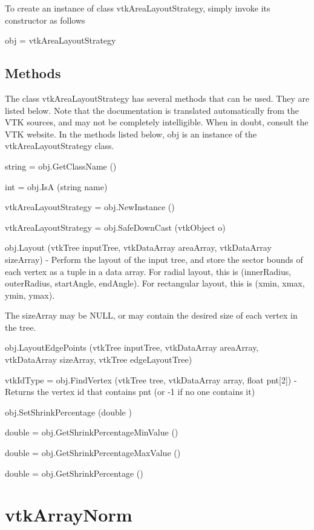 To create an instance of class vtk\-Area\-Layout\-Strategy, simply invoke its constructor as follows \begin{DoxyVerb}  obj = vtkAreaLayoutStrategy
\end{DoxyVerb}
 \hypertarget{vtkwidgets_vtkxyplotwidget_Methods}{}\subsection{Methods}\label{vtkwidgets_vtkxyplotwidget_Methods}
The class vtk\-Area\-Layout\-Strategy has several methods that can be used. They are listed below. Note that the documentation is translated automatically from the V\-T\-K sources, and may not be completely intelligible. When in doubt, consult the V\-T\-K website. In the methods listed below, {\ttfamily obj} is an instance of the vtk\-Area\-Layout\-Strategy class. 
\begin{DoxyItemize}
\item {\ttfamily string = obj.\-Get\-Class\-Name ()}  
\item {\ttfamily int = obj.\-Is\-A (string name)}  
\item {\ttfamily vtk\-Area\-Layout\-Strategy = obj.\-New\-Instance ()}  
\item {\ttfamily vtk\-Area\-Layout\-Strategy = obj.\-Safe\-Down\-Cast (vtk\-Object o)}  
\item {\ttfamily obj.\-Layout (vtk\-Tree input\-Tree, vtk\-Data\-Array area\-Array, vtk\-Data\-Array size\-Array)} -\/ Perform the layout of the input tree, and store the sector bounds of each vertex as a tuple in a data array. For radial layout, this is (inner\-Radius, outer\-Radius, start\-Angle, end\-Angle). For rectangular layout, this is (xmin, xmax, ymin, ymax).

The size\-Array may be N\-U\-L\-L, or may contain the desired size of each vertex in the tree.  
\item {\ttfamily obj.\-Layout\-Edge\-Points (vtk\-Tree input\-Tree, vtk\-Data\-Array area\-Array, vtk\-Data\-Array size\-Array, vtk\-Tree edge\-Layout\-Tree)}  
\item {\ttfamily vtk\-Id\-Type = obj.\-Find\-Vertex (vtk\-Tree tree, vtk\-Data\-Array array, float pnt\mbox{[}2\mbox{]})} -\/ Returns the vertex id that contains pnt (or -\/1 if no one contains it)  
\item {\ttfamily obj.\-Set\-Shrink\-Percentage (double )}  
\item {\ttfamily double = obj.\-Get\-Shrink\-Percentage\-Min\-Value ()}  
\item {\ttfamily double = obj.\-Get\-Shrink\-Percentage\-Max\-Value ()}  
\item {\ttfamily double = obj.\-Get\-Shrink\-Percentage ()}  
\end{DoxyItemize}\hypertarget{vtkinfovis_vtkarraynorm}{}\section{vtk\-Array\-Norm}\label{vtkinfovis_vtkarraynorm}
